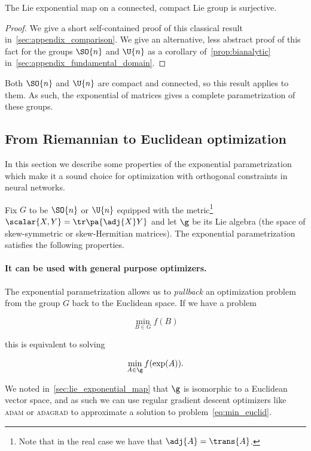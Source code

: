 \begin{theorem}\label{thm:surjective}
    The Lie exponential map on a connected, compact Lie group is surjective.
\end{theorem}

\begin{proof}
We give a short self-contained proof of this classical result in~\ref{sec:appendix_comparison}. We give an alternative, less abstract proof of this fact for the groups $\SO{n}$ and $\U{n}$ as a corollary of~\ref{prop:bianalytic} in~\ref{sec:appendix_fundamental_domain}.
\end{proof}

Both $\SO{n}$ and $\U{n}$ are compact and connected, so this result applies to them. As such, the exponential of matrices gives a complete parametrization of these groups.

\subsection{From Riemannian to Euclidean optimization} In this section we describe some properties of the exponential parametrization which make it a sound choice for optimization with orthogonal constraints in neural networks.

Fix $G$ to be $\SO{n}$ or $\U{n}$ equipped with the metric\footnote{Note that in the real case we have that $\adj{A} = \trans{A}$.} $\scalar{X,Y} = \tr\pa{\adj{X}Y}$ and let $\g$ be its Lie algebra (the space of skew-symmetric or skew-Hermitian matrices). The exponential parametrization satisfies the following properties.

\paragraph{It can be used with general purpose optimizers.} The exponential parametrization allows us to \emph{pullback} an optimization problem from the group $G$ back to the Euclidean space. If we have a problem

\begin{equation}\label{eq:min_riemann}
     \min_{B \in G} f(B)
\end{equation}

this is equivalent to solving

\begin{equation}\label{eq:min_euclid}
    \min_{A \in \g} f(\exp(A)).
\end{equation}

We noted in~\ref{sec:lie_exponential_map} that $\g$ is isomorphic to a Euclidean vector space, and as such we can use regular gradient descent optimizers like \textsc{adam} or \textsc{adagrad} to approximate a solution to problem~\eqref{eq:min_euclid}.

